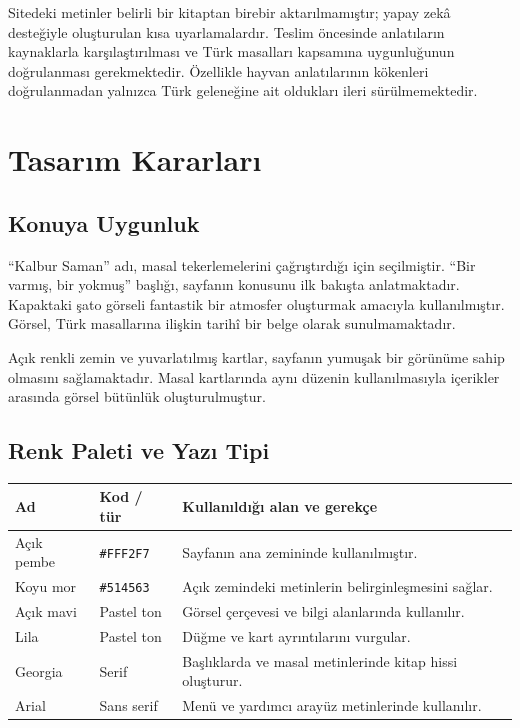 \documentclass[12pt,a4paper]{article}
\begin{document}
Sitedeki metinler belirli bir kitaptan birebir
aktarılmamıştır; yapay zekâ desteğiyle oluşturulan kısa
uyarlamalardır. Teslim öncesinde anlatıların kaynaklarla
karşılaştırılması ve Türk masalları kapsamına
uygunluğunun doğrulanması gerekmektedir. Özellikle hayvan
anlatılarının kökenleri doğrulanmadan yalnızca
Türk geleneğine ait oldukları ileri sürülmemektedir.

\section{Tasarım Kararları}

\subsection{Konuya Uygunluk}

``Kalbur Saman'' adı, masal tekerlemelerini çağrıştırdığı
için seçilmiştir. ``Bir varmış, bir yokmuş'' başlığı,
sayfanın konusunu ilk bakışta anlatmaktadır.
Kapaktaki şato görseli fantastik bir atmosfer
oluşturmak amacıyla kullanılmıştır. Görsel, Türk
masallarına ilişkin tarihî bir belge olarak
sunulmamaktadır.

Açık renkli zemin ve yuvarlatılmış kartlar,
sayfanın yumuşak bir görünüme sahip olmasını
sağlamaktadır. Masal kartlarında aynı düzenin
kullanılmasıyla içerikler arasında görsel
bütünlük oluşturulmuştur.

\subsection{Renk Paleti ve Yazı Tipi}

\begin{center}
\begin{tabular}{@{}p{2.6cm}p{2.8cm}p{7.1cm}@{}}
\toprule
\textbf{Ad} & \textbf{Kod / tür}
& \textbf{Kullanıldığı alan ve gerekçe}\\
\midrule

Açık pembe & \texttt{\#FFF2F7}
& Sayfanın ana zemininde kullanılmıştır.\\

Koyu mor & \texttt{\#514563}
& Açık zemindeki metinlerin belirginleşmesini sağlar.\\

Açık mavi & Pastel ton
& Görsel çerçevesi ve bilgi alanlarında kullanılır.\\

Lila & Pastel ton
& Düğme ve kart ayrıntılarını vurgular.\\

Georgia & Serif
& Başlıklarda ve masal metinlerinde kitap hissi oluşturur.\\

Arial & Sans serif
& Menü ve yardımcı arayüz metinlerinde kullanılır.\\

\bottomrule
\end{tabular}
\end{center}
\end{document}

